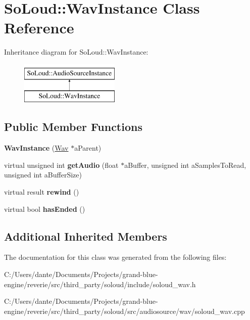 \hypertarget{class_so_loud_1_1_wav_instance}{}\section{So\+Loud\+::Wav\+Instance Class Reference}
\label{class_so_loud_1_1_wav_instance}
Inheritance diagram for So\+Loud\+::Wav\+Instance\+:\begin{figure}[H]
\begin{center}
\leavevmode
\includegraphics[height=2.000000cm]{class_so_loud_1_1_wav_instance}
\end{center}
\end{figure}
\subsection*{Public Member Functions}
\begin{DoxyCompactItemize}
\item 
\mbox{\label{class_so_loud_1_1_wav_instance_ab647cc457e7203c4831321e5675881a7}} 
{\bfseries Wav\+Instance} (\mbox{\hyperlink{class_so_loud_1_1_wav}{Wav}} $\ast$a\+Parent)
\item 
\mbox{\label{class_so_loud_1_1_wav_instance_a6dc5c016ede7bc3ef0152fe7a39781e5}} 
virtual unsigned int {\bfseries get\+Audio} (float $\ast$a\+Buffer, unsigned int a\+Samples\+To\+Read, unsigned int a\+Buffer\+Size)
\item 
\mbox{\label{class_so_loud_1_1_wav_instance_acffb6daf388a726c29ceead00c070326}} 
virtual result {\bfseries rewind} ()
\item 
\mbox{\label{class_so_loud_1_1_wav_instance_aa9b93f5cabe023689798e342d6746519}} 
virtual bool {\bfseries has\+Ended} ()
\end{DoxyCompactItemize}
\subsection*{Additional Inherited Members}


The documentation for this class was generated from the following files\+:\begin{DoxyCompactItemize}
\item 
C\+:/\+Users/dante/\+Documents/\+Projects/grand-\/blue-\/engine/reverie/src/third\+\_\+party/soloud/include/soloud\+\_\+wav.\+h\item 
C\+:/\+Users/dante/\+Documents/\+Projects/grand-\/blue-\/engine/reverie/src/third\+\_\+party/soloud/src/audiosource/wav/soloud\+\_\+wav.\+cpp\end{DoxyCompactItemize}
